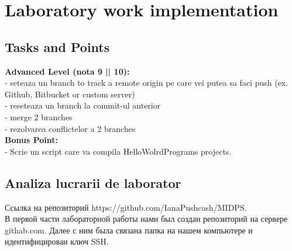 \section{Laboratory work implementation}

\subsection{Tasks and Points}

\textbf{Advanced Level (nota 9 || 10):}\\
\indent 
- seteaza un branch to track a remote origin pe care vei putea sa faci push (ex. Github, Bitbucket or custom server)\\
\indent 
- reseteaza un branch la commit-ul anterior\\
\indent 
- merge 2 branches\\
\indent 
- rezolvarea conflictelor a 2 branches\\
\indent 
\textbf{Bonus Point:}\\
\indent 
- Scrie un script care va compila HelloWolrdPrograms projects.\\
\indent 

\subsection{Analiza lucrarii de laborator}

Ссылка на репозиторий https://github.com/IanaPushcash/MIDPS.\\
\indent 
В первой части лабораторной работы нами был создан репозиторий на сервере githab.com. Далее с ним была связана папка на нашем компьютере и идентифицирован ключ SSH.\\\\
\indent 

